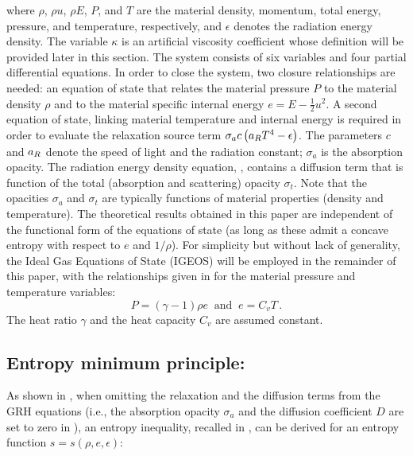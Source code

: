 \documentclass[times,doublespace]{fldauth}%
\begin{document}
%
where $\rho$, $\rho u$, $\rho E$, $P$, and $T$ are the material density, momentum, total energy, pressure, and temperature, respectively, and $\epsilon$ denotes the radiation energy density. The variable $\kappa$ is an artificial viscosity coefficient whose definition will be provided  later in this section. 
The system consists of six variables and four partial differential equations. In order to close the system, two closure relationships are needed:  
an equation of state that relates the material pressure $P$ to the material density $\rho$ and to the 
material specific internal energy $e = E - \tfrac 1 2 u^2$. A second equation of state, linking material temperature 
and internal energy is required in order to evaluate the relaxation source term $\sigma_a c \left( a_R T^4 - \epsilon \right)$.
The parameters $c$ and $a_R$ denote the speed of light and the radiation constant; $\sigma_a$ is the absorption opacity. 
The radiation energy density equation, , contains a diffusion term that is function of the 
total (absorption and scattering) opacity $\sigma_t$. Note that the opacities $\sigma_a$ and $\sigma_t$ are typically functions of 
material properties (density and temperature). 
The theoretical results obtained in this paper are independent of the functional form of the equations of state 
(as long as these admit a concave entropy with respect to $e$ and $1/ \rho$). For simplicity but without lack of generality, the Ideal Gas Equations of State
(IGEOS) will be employed in the remainder of this paper, with the relationships given in  for the material pressure and temperature variables:
%
\begin{equation}\label{eq:IGEOS}
P = (\gamma-1) \rho e \ \text{  and  } \ e = C_v T \, .
\end{equation}
%
The heat ratio $\gamma$ and the heat capacity $C_v$ are assumed constant.
%
\subsection{Entropy minimum principle:}\label{sec:ent-min}
%
As shown in \cite{our_jcp_radhy_paper}, when omitting the relaxation and the diffusion terms from the GRH equations (i.e., the absorption opacity $\sigma_a$ and the diffusion coefficient $D$ are set to zero in ), an entropy inequality, recalled in , can be derived for an entropy function $s=s(\rho, e, \epsilon)$:
\end{document}
